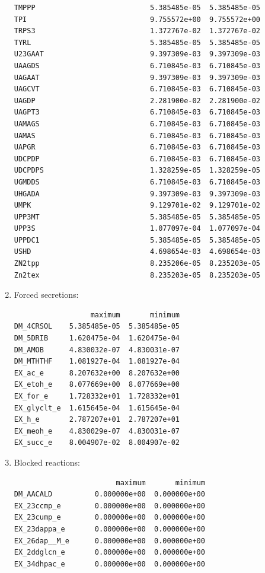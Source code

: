 \documentclass{scrartcl}
\begin{document}
\begin{enumerate}
\begin{lstlisting}
TMPPP                           5.385485e-05  5.385485e-05
TPI                             9.755572e+00  9.755572e+00
TRPS3                           1.372767e-02  1.372767e-02
TYRL                            5.385485e-05  5.385485e-05
U23GAAT                         9.397309e-03  9.397309e-03
UAAGDS                          6.710845e-03  6.710845e-03
UAGAAT                          9.397309e-03  9.397309e-03
UAGCVT                          6.710845e-03  6.710845e-03
UAGDP                           2.281900e-02  2.281900e-02
UAGPT3                          6.710845e-03  6.710845e-03
UAMAGS                          6.710845e-03  6.710845e-03
UAMAS                           6.710845e-03  6.710845e-03
UAPGR                           6.710845e-03  6.710845e-03
UDCPDP                          6.710845e-03  6.710845e-03
UDCPDPS                         1.328259e-05  1.328259e-05
UGMDDS                          6.710845e-03  6.710845e-03
UHGADA                          9.397309e-03  9.397309e-03
UMPK                            9.129701e-02  9.129701e-02
UPP3MT                          5.385485e-05  5.385485e-05
UPP3S                           1.077097e-04  1.077097e-04
UPPDC1                          5.385485e-05  5.385485e-05
USHD                            4.698654e-03  4.698654e-03
ZN2tpp                          8.235206e-05  8.235203e-05
Zn2tex                          8.235203e-05  8.235203e-05
\end{lstlisting}
\item  Forced secretions:
\begin{lstlisting}
                  maximum       minimum
DM_4CRSOL    5.385485e-05  5.385485e-05
DM_5DRIB     1.620475e-04  1.620475e-04
DM_AMOB      4.830032e-07  4.830031e-07
DM_MTHTHF    1.081927e-04  1.081927e-04
EX_ac_e      8.207632e+00  8.207632e+00
EX_etoh_e    8.077669e+00  8.077669e+00
EX_for_e     1.728332e+01  1.728332e+01
EX_glyclt_e  1.615645e-04  1.615645e-04
EX_h_e       2.787207e+01  2.787207e+01
EX_meoh_e    4.830029e-07  4.830031e-07
EX_succ_e    8.004907e-02  8.004907e-02
\end{lstlisting}
\item Blocked reactions:
\begin{lstlisting}
                        maximum       minimum
DM_AACALD          0.000000e+00  0.000000e+00
EX_23ccmp_e        0.000000e+00  0.000000e+00
EX_23cump_e        0.000000e+00  0.000000e+00
EX_23dappa_e       0.000000e+00  0.000000e+00
EX_26dap__M_e      0.000000e+00  0.000000e+00
EX_2ddglcn_e       0.000000e+00  0.000000e+00
EX_34dhpac_e       0.000000e+00  0.000000e+00

\end{lstlisting}
\end{enumerate}
\end{document}
